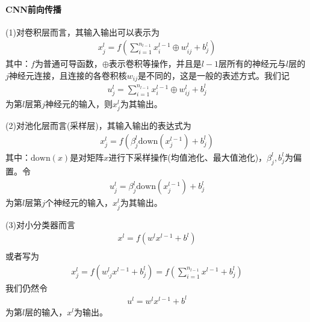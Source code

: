             \paragraph{CNN前向传播}(1)对卷积层而言，其输入输出可以表示为
            \begin{align*}
            x_j^l = f \left( \sum_{i=1}^{n_{l-1}}x_i^{l-1}\oplus w_{ij}^l + b_j^l \right)
            \end{align*}
            其中：$f$为普通可导函数，$\oplus$表示卷积等操作，并且是$l-1$层所有的神经元与$l$层的$j$神经元连接，且连接的各卷积核$w_{ij}$是不同的，这是一般的表述方式。我们记
            \begin{align*}
            u_j^l = \sum_{i=1}^{n_{l-1}}x_i^{l-1}\oplus w_{ij}^l + b_j^l
            \end{align*}
            为第$l$层第$j$神经元的输入，则$x_j^l$为其输出。
            \par
            (2)对池化层而言(采样层)，其输入输出的表达式为
            \begin{align*}
            x_j^l = f \left( \beta_j^l \mathrm{down} \left( x_j^{l-1} \right)  + b_j^l \right)
            \end{align*}
            其中：$\mathrm{down}(x)$是对矩阵$x$进行下采样操作(均值池化、最大值池化)，$\beta_j^l,b_j^l$为偏置。令
            \begin{align*}
            u_j^l = \beta_j^l \mathrm{down} \left( x_j^{l-1} \right)  + b_j^l
            \end{align*}
            为第$l$层第$j$个神经元的输入，$x_j^l$为其输出。
            \par
            (3)对小分类器而言
            \begin{align*}
            x^l = f(w^lx^{l-1}+b^l)\\
            \end{align*}
            或者写为
            \begin{align*}
            x_j^l = f \left( w_{\cdot j}^l x^{l-1} + b_j^l \right) = f \left(  \sum_{i=1}^{n_{l-1}}x^{l-1}+b_j^l \right)
            \end{align*}
            我们仍然令
            \begin{align*}
            u^l = w^lx^{l-1}+b^l
            \end{align*}
            为第$l$层的输入，$x^l$为输出。
